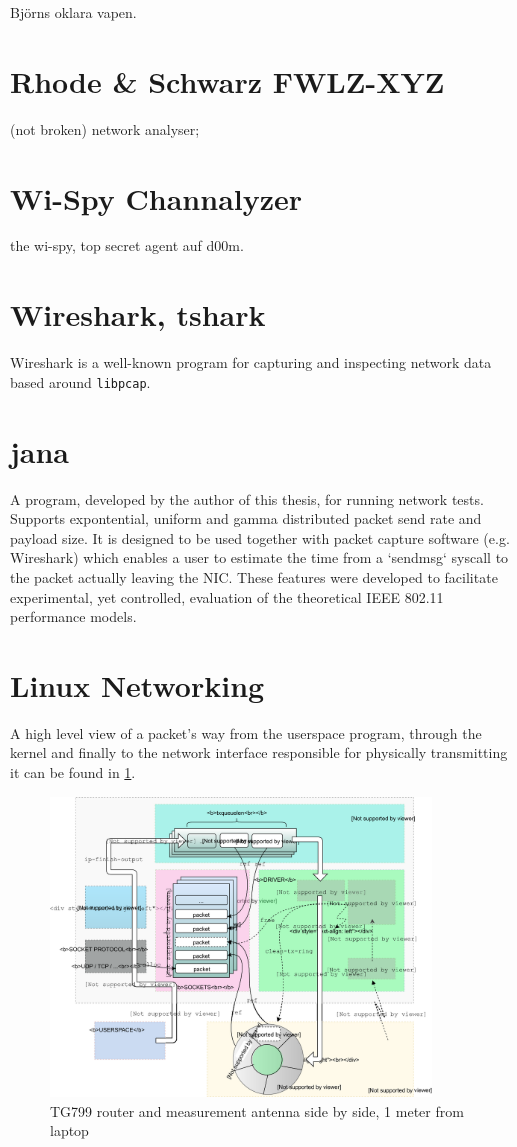 Björns oklara vapen.

\section{Rhode \& Schwarz FWLZ-XYZ}

(not broken) network analyser;

\section{Wi-Spy Channalyzer}

the wi-spy, top secret agent auf d00m.

\section{Wireshark, tshark}

Wireshark is a well-known program for capturing and inspecting network data
based around \texttt{libpcap}.

\section{jana}

A program, developed by the author of this thesis, for running network tests.
Supports expontential, uniform and gamma distributed packet send rate and
payload size. It is designed to be used together with packet capture software
(e.g. Wireshark) which enables a user to estimate the time from a `sendmsg`
syscall to the packet actually leaving the NIC. These features were developed
to facilitate experimental, yet controlled, evaluation of the theoretical IEEE
802.11 performance models.

\section{Linux Networking}

A high level view of a packet's way from the userspace program, through the
kernel and finally to the network interface responsible for physically
transmitting it can be found in \ref{fig:linux_egress}.

\begin{figure}
\center
\includegraphics[width=0.9\textwidth]{images/linux-egress-overview.eps}
\caption{TG799 router and measurement antenna side by side, 1 meter from laptop}
\label{fig:linux_egress}
\end{figure}
